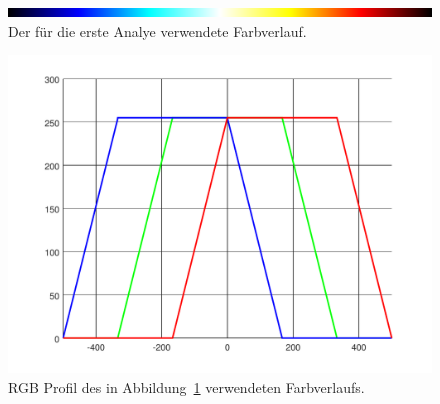 \begin{figure}
	\centering
	\includegraphics[width=\linewidth]{cmb/converter/converter-function-strip.png}
	\caption{Der für die erste Analye verwendete Farbverlauf.}
	\label{fig:color-strip}
\end{figure}

\begin{figure}
	\centering
	\includegraphics[width=\linewidth]{cmb/converter/converter-function.pdf}
	\caption{RGB Profil des in Abbildung~\ref{fig:color-strip} 
		verwendeten Farbverlaufs.}
	\label{fig:color-strip-rgb}
\end{figure}